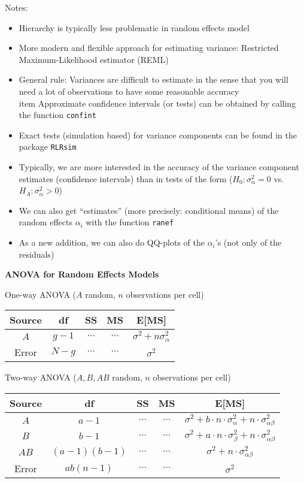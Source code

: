 \documentclass[a4paper]{article}
\begin{document}
Notes:
\begin{itemize}
    \item Hierarchy is typically less problematic in random effects model
    \item More modern and flexible approach for estimating variance: Restricted Maximum-Likelihood estimator (REML)
    \item General rule: Variances are difficult to estimate in the sense that you will need a lot of observations to have some reasonable accuracy
    \\item Approximate confidence intervals (or tests) can be obtained by calling the function \texttt{confint}
    \item Exact tests (simulation based) for variance components can be found in the package \texttt{RLRsim}
    \item Typically, we are more interested in the accuracy of the variance component estimates (confidence intervals) than in tests of the form ($H_0:\sigma_{\alpha}^2=0$ vs. $H_A:\sigma_{\alpha}^2>0$) 
    \item We can also get ``estimates'' (more precisely: conditional means) of the random effects $\alpha_i$ with the function \texttt{ranef}
    \item As a new addition, we can also do QQ-plots of the $\alpha_i$'s (not only of the residuals)
\end{itemize}

\textbf{ANOVA for Random Effects Models}

One-way ANOVA ($A$ random, $n$ observations per cell)
\begin{table}[!htbp]
    \centering
    \begin{tabular}{c|c|c|c|c}
    \textbf{Source} & \textbf{df} & \textbf{SS} & \textbf{MS} & \textbf{E[MS]} \\
    \hline
    $A$ & $g-1$ & $\cdots$ & $\cdots$ & $\sigma^2+n\sigma_{\alpha}^2$  \\
    \hline
    Error & $N-g$ & $\cdots$ & $\cdots$ & $\sigma^2$ 
    \end{tabular}
\end{table}

Two-way ANOVA ($A, B, AB$ random, $n$ observations per cell)
\begin{table}[!htbp]
    \centering
    \begin{tabular}{c|c|c|c|c}
    \textbf{Source} & \textbf{df} & \textbf{SS} & \textbf{MS} & \textbf{E[MS]} \\
    \hline
    $A$ & $a-1$ & $\cdots$ & $\cdots$ & $\sigma^2+b\cdot n\cdot\sigma_{\alpha}^2+n\cdot\sigma_{\alpha\beta}^2$  \\
    \hline
    $B$ & $b-1$ & $\cdots$ & $\cdots$ & $\sigma^2+a\cdot n\cdot\sigma_{\beta}^2+n\cdot\sigma_{\alpha\beta}^2$  \\
    \hline
    $AB$ & $(a-1)(b-1)$ & $\cdots$ & $\cdots$ & $\sigma^2+n\cdot\sigma_{\alpha\beta}^2$  \\
    \hline
    Error & $ab(n-1)$ & $\cdots$ & $\cdots$ & $\sigma^2$ 
    \end{tabular}
\end{table}
\end{document}
